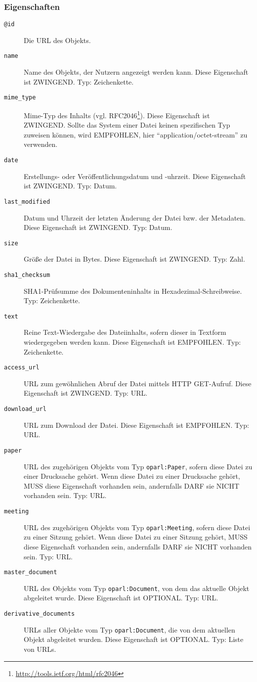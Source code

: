 \documentclass[,a4paper]{article}
\begin{document}
\subsubsection{Eigenschaften}\label{eigenschaften-7}

\begin{description}
\item[\texttt{@id}]
Die URL des Objekts.
\item[\texttt{name}]
Name des Objekts, der Nutzern angezeigt werden kann. Diese Eigenschaft
ist ZWINGEND. Typ: Zeichenkette.
\item[\texttt{mime\_type}]
Mime-Typ des Inhalts (vgl. RFC2046\footnote{\url{http://tools.ietf.org/html/rfc2046}}).
Diese Eigenschaft ist ZWINGEND. Sollte das System einer Datei keinen
spezifischen Typ zuweisen können, wird EMPFOHLEN, hier
``application/octet-stream'' zu verwenden.
\item[\texttt{date}]
Erstellungs- oder Veröffentlichungsdatum und -uhrzeit. Diese Eigenschaft
ist ZWINGEND. Typ: Datum.
\item[\texttt{last\_modified}]
Datum und Uhrzeit der letzten Änderung der Datei bzw. der Metadaten.
Diese Eigenschaft ist ZWINGEND. Typ: Datum.
\item[\texttt{size}]
Größe der Datei in Bytes. Diese Eigenschaft ist ZWINGEND. Typ: Zahl.
\item[\texttt{sha1\_checksum}]
SHA1-Prüfsumme des Dokumenteninhalts in Hexadezimal-Schreibweise. Typ:
Zeichenkette.
\item[\texttt{text}]
Reine Text-Wiedergabe des Dateiinhalts, sofern dieser in Textform
wiedergegeben werden kann. Diese Eigenschaft ist EMPFOHLEN. Typ:
Zeichenkette.
\item[\texttt{access\_url}]
URL zum gewöhnlichen Abruf der Datei mittels HTTP GET-Aufruf. Diese
Eigenschaft ist ZWINGEND. Typ: URL.
\item[\texttt{download\_url}]
URL zum Download der Datei. Diese Eigenschaft ist EMPFOHLEN. Typ: URL.
\item[\texttt{paper}]
URL des zugehörigen Objekts vom Typ \texttt{oparl:Paper}, sofern diese
Datei zu einer Drucksache gehört. Wenn diese Datei zu einer Drucksache
gehört, MUSS diese Eigenschaft vorhanden sein, andernfalls DARF sie
NICHT vorhanden sein. Typ: URL.
\item[\texttt{meeting}]
URL des zugehörigen Objekts vom Typ \texttt{oparl:Meeting}, sofern diese
Datei zu einer Sitzung gehört. Wenn diese Datei zu einer Sitzung gehört,
MUSS diese Eigenschaft vorhanden sein, andernfalls DARF sie NICHT
vorhanden sein. Typ: URL.
\item[\texttt{master\_document}]
URL des Objekts vom Typ \texttt{oparl:Document}, von dem das aktuelle
Objekt abgeleitet wurde. Diese Eigenschaft ist OPTIONAL. Typ: URL.
\item[\texttt{derivative\_documents}]
URLs aller Objekte vom Typ \texttt{oparl:Document}, die von dem
aktuellen Objekt abgeleitet wurden. Diese Eigenschaft ist OPTIONAL. Typ:
Liste von URLs.
\end{description}
\end{document}
